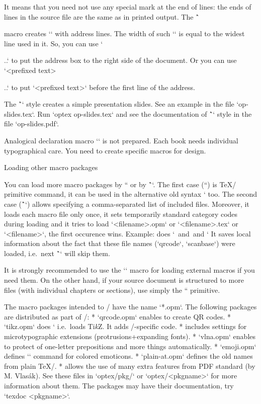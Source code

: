 {It means that you need not use any special mark at the end of lines: the ends
of lines in the source file are the same as in printed output. The
\^`\address` macro creates `\vtop` with address lines. The width of such
`\vtop` is equal to the widest line used in it. So, you can use
`\hfill\address...` to put the address box to the right side of the
document. Or you can use `<prefixed text>\address...` to put
`<prefixed text>` before the first line of the address.

The \^`\slides` style creates a simple presentation slides. See an example
in the file `op-slides.tex`. Run `optex op-slides.tex` and see the documentation of
\^`\slides` style in the file `op-slides.pdf`.

Analogical declaration macro `\book` is not prepared. Each book needs
individual typographical care. You need to create specific macros for
design.

\secc Loading other macro packages

You can load more macro packages by `` or by
\^``. The first case (``) is \TeX/ primitive command, it can be
used in the alternative old syntax ` too. The
second case (\^`\load`) allows specifying a comma-separated list of included files.
Moreover, it loads each macro file only once, it sets
temporarily standard category codes during loading and it tries to
load `<filename>.opm` or `<filename>.tex` or `<filename>`, the first occurence
wins. Example:
\begtt
{}
\endtt
%
does ` \,and \,and `
It saves local information about the fact that these file names
(`qrcode`, `scanbase`) were loaded, i.e.\ next \^`\load` will skip them.

It is strongly recommended to use the `\load` macro for loading external
macros if you need them. On the other hand, if your source document is structured
to more files (with individual chapters or sections), use simply the `` primitive.

The macro packages intended to \OpTeX/ have the name `*.opm`.
The following packages are distributed as part of \OpTeX/:
\begitems
* `qrcode.opm` enables to create QR codes.
* `tikz.opm` does ` i.e.\ loads Ti{\it k\/}Z. It adds \OpTeX/-specific code.
* 
  includes settings for microtypographic extensions (protrusions+expanding fonts).
* `vlna.opm` enables to protect of one-letter prepositions and more things automatically.
* `emoji.opm` defines `` command for colored emoticons.
* `plain-at.opm` defines the old names from plain \TeX/.
* 
  allows the use of many extra features from PDF standard (by M. Vlasák).
\enditems
See these files in `optex/pkg/` or `optex/<pkgname>` for more information about
them. The packages may have their documentation, try `texdoc <pkgname>`.

}
